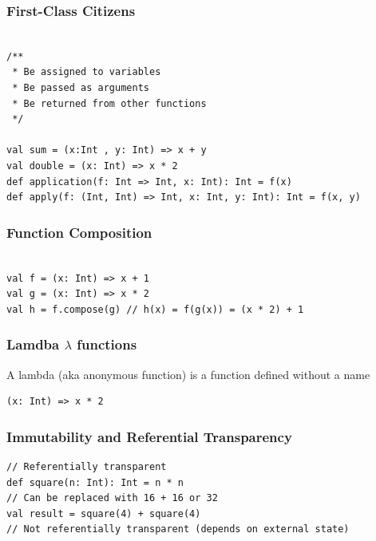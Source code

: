 \documentclass{beamer}
\begin{document}
\begin{frame}[fragile]
\frametitle{First-Class Citizens}

\begin{lstlisting}[style=scalaStyle]

/**
 * Be assigned to variables
 * Be passed as arguments
 * Be returned from other functions
 */

val sum = (x:Int , y: Int) => x + y
val double = (x: Int) => x * 2
def application(f: Int => Int, x: Int): Int = f(x)
def apply(f: (Int, Int) => Int, x: Int, y: Int): Int = f(x, y)

\end{lstlisting}

\end{frame}

\begin{frame}[fragile]
\frametitle{Function Composition}

\begin{lstlisting}[style=scalaStyle]

val f = (x: Int) => x + 1
val g = (x: Int) => x * 2
val h = f.compose(g) // h(x) = f(g(x)) = (x * 2) + 1

\end{lstlisting}

\end{frame}


\begin{frame}[fragile]
\frametitle{Lamdba  \( \lambda \) functions}

A lambda (aka anonymous function) is a function defined without a name


\begin{lstlisting}[style=scalaStyle]
(x: Int) => x * 2
\end{lstlisting}

\end{frame}

\begin{frame}[fragile]
\frametitle{Immutability and Referential Transparency}

\begin{lstlisting}[style=scalaStyle]
// Referentially transparent
def square(n: Int): Int = n * n
// Can be replaced with 16 + 16 or 32
val result = square(4) + square(4)  
// Not referentially transparent (depends on external state)

\end{lstlisting}

\end{frame}
\end{document}
